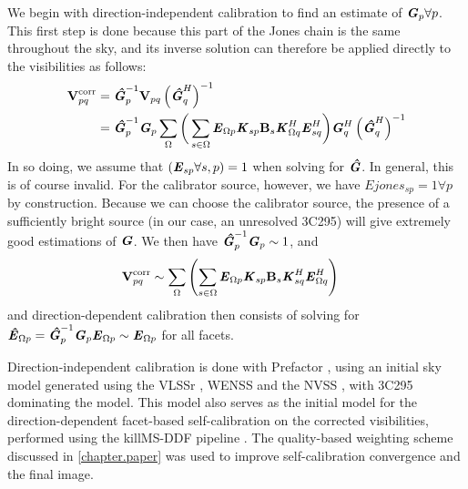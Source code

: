 \pg
We begin with direction-independent calibration to find an estimate of $\textbf{\emph{G}}_p\forall p$. This first step is done because this part of the Jones chain is the same throughout the sky, and its inverse solution can therefore be applied directly to the visibilities as follows:
\begin{align}
\textbf{V}_{pq}^\mathrm{corr} &= \textbf{\emph{\^{G}}}_p^{-1} \textbf{V}_{pq} \left( \textbf{\emph{\^{G}}}_q^H \right)^{-1}\\
						&= \textbf{\emph{\^{G}}}_p^{-1}\textbf{\emph{G}}_p \sum_{\Omega}\bigg( \sum_{s\in\Omega} \textbf{\emph{E}}_{\Omega p} \textbf{\emph{K}}_{sp} \textbf{B}_{s} \textbf{\emph{K}}_{\Omega q}^H \textbf{\emph{E}}_{sq}^H \bigg) \textbf{\emph{G}}_q^H \left( \textbf{\emph{\^{G}}}_q^H \right)^{-1}
\end{align}
In so doing, we assume that $\left(\textbf{\emph{E}}_{sp}\forall s,p\right) =1$ when solving for $\textbf{\emph{\^{G}}}$. In general, this is of course invalid. For the calibrator source, however, we have $Ejones_{sp} =1 \forall p$ by construction. Because we can choose the calibrator source, the presence of a sufficiently bright source (in our case, an unresolved 3C295) will give extremely good estimations of $\textbf{\emph{G}}$. We then have $\textbf{\emph{\^{G}}}_p^{-1}\textbf{\emph{G}}_p\sim 1$, and
\begin{align}
\textbf{V}_{pq}^\mathrm{corr} &\sim \sum_{\Omega}\left( \sum_{s\in\Omega} \textbf{\emph{E}}_{\Omega p} \textbf{\emph{K}}_{sp} \textbf{B}_{s} \textbf{\emph{K}}_{sq}^H \textbf{\emph{E}}_{\Omega q}^H \right)
\end{align}
and direction-dependent calibration then consists of solving for $\textbf{\emph{\^{E}}}_{\Omega p} = \textbf{\emph{\^{G}}}_p^{-1}\textbf{\emph{G}}_p\textbf{\emph{E}}_{\Omega p} \sim \textbf{\emph{E}}_{\Omega p}$ for all facets.

\pg
Direction-independent calibration is done with Prefactor , using an initial sky model generated using the VLSSr , WENSS  and the NVSS , with 3C295 dominating the model. This model also serves as the initial model for the direction-dependent facet-based self-calibration on the corrected visibilities, performed using the killMS-DDF pipeline . The quality-based weighting scheme discussed in \cref{chapter.paper} was used to improve self-calibration convergence and the final image.

